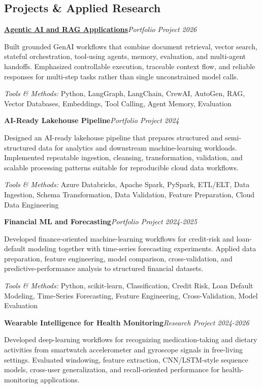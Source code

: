 \documentclass[9pt,letterpaper]{extarticle}
\newcommand{\entry}[2]{\Needspace{4\baselineskip}\textbf{#1}\hfill\textit{#2}\par}
\begin{document}
\subsection{Projects \& Applied Research}
\entry{\href{https://github.com/WaseemRaza844/agentic-ai-projects-by-was}{Agentic AI and RAG Applications}}{Portfolio Project \textbar{} 2026}
Built grounded GenAI workflows that combine document retrieval, vector search, stateful orchestration, tool-using agents, memory, evaluation, and multi-agent handoffs. Emphasized controllable execution, traceable context flow, and reliable responses for multi-step tasks rather than single unconstrained model calls.\par
{\small\textit{Tools \& Methods:} Python, LangGraph, LangChain, CrewAI, AutoGen, RAG, Vector Databases, Embeddings, Tool Calling, Agent Memory, Evaluation\par}
\vspace{1pt}
\entry{AI-Ready Lakehouse Pipeline}{Portfolio Project \textbar{} 2024}
Designed an AI-ready lakehouse pipeline that prepares structured and semi-structured data for analytics and downstream machine-learning workloads. Implemented repeatable ingestion, cleansing, transformation, validation, and scalable processing patterns suitable for reproducible cloud data workflows.\par
{\small\textit{Tools \& Methods:} Azure Databricks, Apache Spark, PySpark, ETL/ELT, Data Ingestion, Schema Transformation, Data Validation, Feature Preparation, Cloud Data Engineering\par}
\vspace{1pt}
\entry{Financial ML and Forecasting}{Portfolio Project \textbar{} 2024-2025}
Developed finance-oriented machine-learning workflows for credit-risk and loan-default modeling together with time-series forecasting experiments. Applied data preparation, feature engineering, model comparison, cross-validation, and predictive-performance analysis to structured financial datasets.\par
{\small\textit{Tools \& Methods:} Python, scikit-learn, Classification, Credit Risk, Loan Default Modeling, Time-Series Forecasting, Feature Engineering, Cross-Validation, Model Evaluation\par}
\vspace{1pt}
\entry{Wearable Intelligence for Health Monitoring}{Research Project \textbar{} 2024-2026}
Developed deep-learning workflows for recognizing medication-taking and dietary activities from smartwatch accelerometer and gyroscope signals in free-living settings. Evaluated windowing, feature extraction, CNN/LSTM-style sequence models, cross-user generalization, and recall-oriented performance for health-monitoring applications.\par
\end{document}
